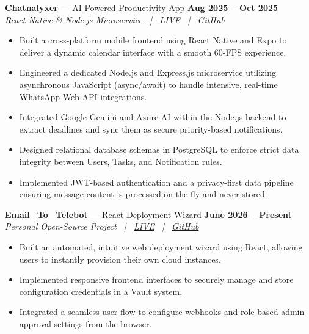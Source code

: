 \documentclass[10pt,a4paper]{article}
\begin{document}
\vspace{3pt}

\noindent\textbf{Chatnalyxer} --- AI-Powered Productivity App \hfill \textbf{Aug 2025 -- Oct 2025} \\
\textit{React Native \& Node.js Microservice \ | \ \href{http://chatnalyxer.app/}{LIVE} \ | \ \href{https://github.com/Rahul-pamula/chatnalyxer.git}{GitHub}}
\begin{itemize}[leftmargin=1.2em, topsep=1pt, itemsep=0pt, parsep=0pt]
    \item Built a cross-platform mobile frontend using React Native and Expo to deliver a dynamic calendar interface with a smooth 60-FPS experience.
    \item Engineered a dedicated Node.js and Express.js microservice utilizing asynchronous JavaScript (async/await) to handle intensive, real-time WhatsApp Web API integrations.
    \item Integrated Google Gemini and Azure AI within the Node.js backend to extract deadlines and sync them as secure priority-based notifications.
    \item Designed relational database schemas in PostgreSQL to enforce strict data integrity between Users, Tasks, and Notification rules.
    \item Implemented JWT-based authentication and a privacy-first data pipeline ensuring message content is processed on the fly and never stored.
\end{itemize}

\vspace{3pt}

\noindent\textbf{Email\_To\_Telebot} --- React Deployment Wizard \hfill \textbf{June 2026 -- Present} \\
\textit{Personal Open-Source Project \ | \ \href{https://rahul-pamula.github.io/Email_to_telebot/}{LIVE} \ | \ \href{https://github.com/Rahul-pamula/Email_to_telebot}{GitHub}}
\begin{itemize}[leftmargin=1.2em, topsep=1pt, itemsep=0pt, parsep=0pt]
    \item Built an automated, intuitive web deployment wizard using React, allowing users to instantly provision their own cloud instances.
    \item Implemented responsive frontend interfaces to securely manage and store configuration credentials in a Vault system.
    \item Integrated a seamless user flow to configure webhooks and role-based admin approval settings from the browser.
\end{itemize}
\end{document}
